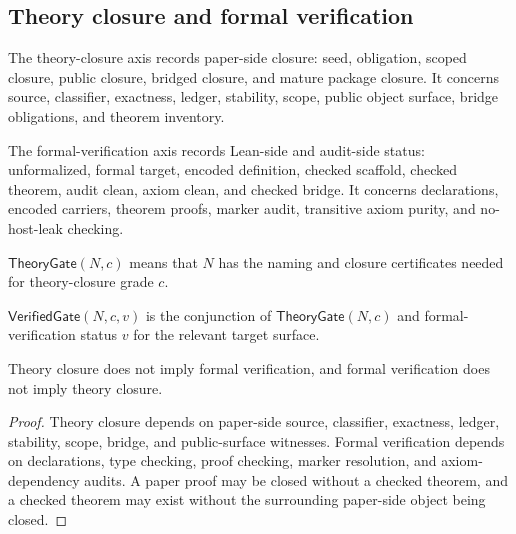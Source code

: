 \subsection{Theory closure and formal verification}
\label{subsec:philosophy-theory-formal-axes}

\begin{definition}
\label{def:philosophy-theory-closure-axis}
The theory-closure axis records paper-side closure: seed, obligation,
scoped closure, public closure, bridged closure, and mature package
closure. It concerns source, classifier, exactness, ledger, stability,
scope, public object surface, bridge obligations, and theorem
inventory.
\end{definition}

\begin{definition}
\label{def:philosophy-formal-verification-axis}
The formal-verification axis records Lean-side and audit-side status:
unformalized, formal target, encoded definition, checked scaffold,
checked theorem, audit clean, axiom clean, and checked bridge. It
concerns declarations, encoded carriers, theorem proofs, marker audit,
transitive axiom purity, and no-host-leak checking.
\end{definition}

\begin{definition}
\label{def:philosophy-theory-gate}
\(\mathsf{TheoryGate}(N,c)\) means that \(N\) has the naming and
closure certificates needed for theory-closure grade \(c\).
\end{definition}

\begin{definition}
\label{def:philosophy-verified-gate}
\(\mathsf{VerifiedGate}(N,c,v)\) is the conjunction of
\(\mathsf{TheoryGate}(N,c)\) and formal-verification status \(v\) for
the relevant target surface.
\end{definition}

\begin{theorem}
\label{thm:philosophy-theory-formal-independent}
Theory closure does not imply formal verification, and formal
verification does not imply theory closure.
\end{theorem}
\begin{proof}
Theory closure depends on paper-side source, classifier, exactness,
ledger, stability, scope, bridge, and public-surface witnesses. Formal
verification depends on declarations, type checking, proof checking,
marker resolution, and axiom-dependency audits. A paper proof may be
closed without a checked theorem, and a checked theorem may exist
without the surrounding paper-side object being closed.
\end{proof}

